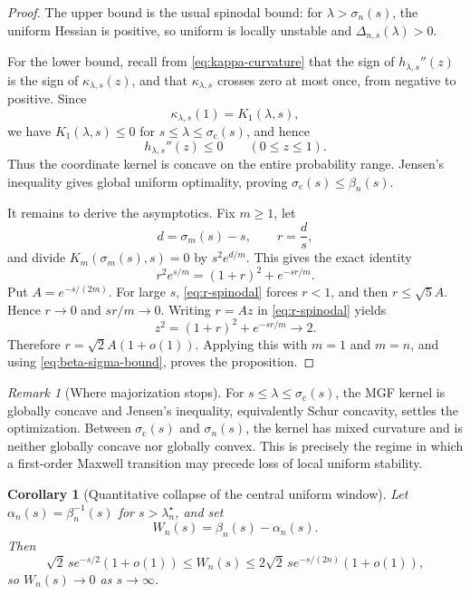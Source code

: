 \documentclass[11pt]{article}
\theoremstyle{plain}
\newtheorem{corollary}[theorem]{Corollary}
\theoremstyle{definition}
\theoremstyle{remark}
\newtheorem{remark}[theorem]{Remark}
\begin{document}
\begin{proof}
The upper bound is the usual spinodal bound: for \(\lambda>\sigma_n(s)\), the uniform Hessian is positive, so uniform is locally unstable and \(\Delta_{n,s}(\lambda)>0\).

For the lower bound, recall from \eqref{eq:kappa-curvature} that the sign of \(h_{\lambda,s}''(z)\) is the sign of \(\kappa_{\lambda,s}(z)\), and that \(\kappa_{\lambda,s}\) crosses zero at most once, from negative to positive.  Since
\[
\kappa_{\lambda,s}(1)=K_1(\lambda,s),
\]
we have \(K_1(\lambda,s)\le0\) for \(s\le\lambda\le\sigma_{\mathrm c}(s)\), and hence
\[
h_{\lambda,s}''(z)\le0
\qquad(0\le z\le1).
\]
Thus the coordinate kernel is concave on the entire probability range.  Jensen's inequality gives global uniform optimality, proving \(\sigma_{\mathrm c}(s)\le\beta_n(s)\).

It remains to derive the asymptotics.  Fix \(m\ge1\), let
\[
d=\sigma_m(s)-s,
\qquad r=\frac ds,
\]
and divide \(K_m(\sigma_m(s),s)=0\) by \(s^2e^{d/m}\).  This gives the exact identity
\begin{equation}\label{eq:r-spinodal}
r^2e^{s/m}=(1+r)^2+e^{-sr/m}.
\end{equation}
Put \(A=e^{-s/(2m)}\).  For large \(s\), \eqref{eq:r-spinodal} forces \(r<1\), and then \(r\le\sqrt5 A\).  Hence \(r\to0\) and \(sr/m\to0\).  Writing \(r=Az\) in \eqref{eq:r-spinodal} yields
\[
z^2=(1+r)^2+e^{-sr/m}\longrightarrow2.
\]
Therefore \(r=\sqrt2A(1+o(1))\).  Applying this with \(m=1\) and \(m=n\), and using \eqref{eq:beta-sigma-bound}, proves the proposition.
\end{proof}

\begin{remark}[Where majorization stops]
For \(s\le\lambda\le\sigma_{\mathrm c}(s)\), the MGF kernel is globally concave and Jensen's inequality, equivalently Schur concavity, settles the optimization.  Between \(\sigma_{\mathrm c}(s)\) and \(\sigma_n(s)\), the kernel has mixed curvature and is neither globally concave nor globally convex.  This is precisely the regime in which a first-order Maxwell transition may precede loss of local uniform stability.
\end{remark}

\begin{corollary}[Quantitative collapse of the central uniform window]\label{cor:window-shrink}
Let \(\alpha_n(s)=\beta_n^{-1}(s)\) for \(s>\lambda_n^\star\), and set
\[
W_n(s)=\beta_n(s)-\alpha_n(s).
\]
Then
\begin{equation}\label{eq:window-bounds}
\sqrt2\,s e^{-s/2}(1+o(1))
\le W_n(s)
\le2\sqrt2\,s e^{-s/(2n)}(1+o(1)),
\end{equation}
so \(W_n(s)\to0\) as \(s\to\infty\).
\end{corollary}
\end{document}
